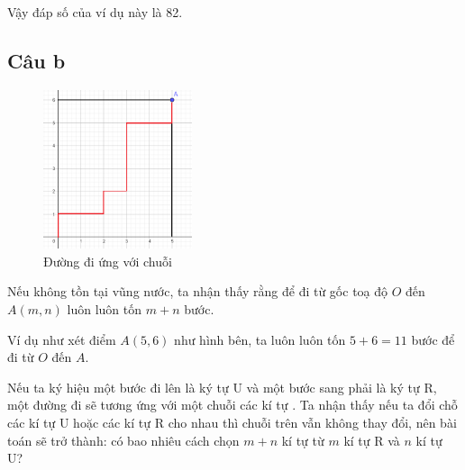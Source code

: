 \documentclass[main.tex]{subfiles}
\begin{document}
\begin{figure}[H]
    \newcommand{\0}{\textcolor{red}{0}}
    \centering
\end{figure}

Vậy đáp số của ví dụ này là 82.

\subsection{Câu b}
\begin{figure}
    \includegraphics[width=0.39\textwidth]{image/Bai8b.png}
    \caption*{Đường đi ứng với chuỗi }
    \vspace*{-2cm}
\end{figure}
Nếu không tồn tại vũng nước, ta nhận thấy rằng để đi từ gốc toạ độ $O$ đến $A(m, n)$ luôn luôn tốn $m+n$ bước. \par Ví dụ như xét điểm $A(5, 6)$ như hình bên, ta luôn luôn tốn $5+6=11$ bước để đi từ $O$ đến $A$.\par 
Nếu ta ký hiệu một bước đi lên là ký tự \cd U và một bước sang phải là ký tự \cd R, một đường đi sẽ tương ứng với một chuỗi các kí tự . Ta nhận thấy nếu ta đổi chỗ các kí tự \cd U hoặc các kí tự \cd R cho nhau thì chuỗi trên vẫn không thay đổi, nên bài toán sẽ trở thành: có bao nhiêu cách chọn $m+n$ kí tự từ $m$ kí tự \cd R và $n$ kí tự \cd U?\bigskip 
\end{document}
